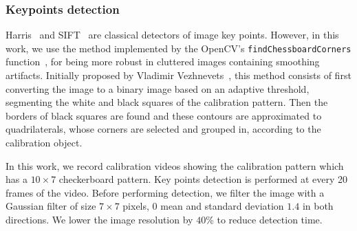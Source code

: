 \subsubsection{Keypoints detection}
%
Harris~\cite{Harris1988} and SIFT~\cite{Lowe2004} are classical detectors of image key points.
However, in this work, we use the method implemented by the OpenCV's
\verb|findChessboardCorners| function~\cite{opencv_library},
for being more robust in cluttered images containing smoothing artifacts.
Initially proposed by Vladimir Vezhnevets~\cite{web:Vezhnevets},
this method consists of first converting the image to a binary image based on an adaptive threshold, segmenting the white and black squares of the calibration pattern.
Then the borders of black squares are found and these contours are approximated to quadrilaterals, whose corners are selected and grouped in, according to the calibration object.
%



In this work, we record calibration videos showing the calibration pattern which has a $10\times7$ checkerboard pattern.
Key points detection is performed at every 20 frames of the video.
Before performing detection, we filter the image with a Gaussian filter of size $7\times 7$ pixels, 0 mean and standard deviation $1.4$ in both directions.
We lower the image resolution by $40$\% to reduce detection time.



